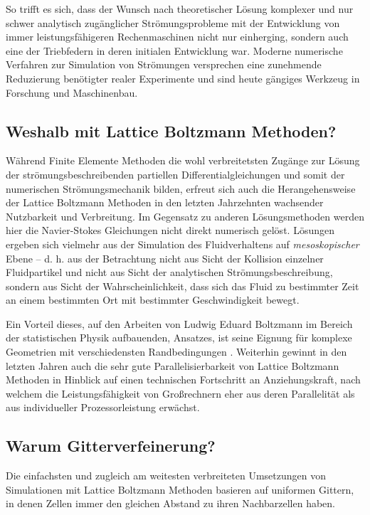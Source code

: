 So trifft es sich, dass der Wunsch nach theoretischer Lösung komplexer und nur schwer analytisch zugänglicher Strömungsprobleme mit der Entwicklung von immer leistungsfähigeren Rechenmaschinen nicht nur einherging, sondern auch eine der Triebfedern in deren initialen Entwicklung war. Moderne numerische Verfahren zur Simulation von Strömungen versprechen eine zunehmende Reduzierung benötigter realer Experimente und sind heute gängiges Werkzeug in Forschung und Maschinenbau.

\subsection{Weshalb mit Lattice Boltzmann Methoden?}

Während Finite Elemente Methoden die wohl verbreitetsten Zugänge zur Lösung der strömungsbeschreibenden partiellen Differentialgleichungen und somit der numerischen Strömungsmechanik bilden, erfreut sich auch die Herangehensweise der Lattice Boltzmann Methoden in den letzten Jahrzehnten wachsender Nutzbarkeit und Verbreitung. Im Gegensatz zu anderen Lösungsmethoden werden hier die Navier-Stokes Gleichungen nicht direkt numerisch gelöst. Lösungen ergeben sich vielmehr aus der Simulation des Fluidverhaltens auf \emph{mesoskopischer} Ebene -- d. h. aus der Betrachtung nicht aus Sicht der Kollision einzelner Fluidpartikel und nicht aus Sicht der analytischen Strömungsbeschreibung, sondern aus Sicht der Wahrscheinlichkeit, dass sich das Fluid zu bestimmter Zeit an einem bestimmten Ort mit bestimmter Geschwindigkeit bewegt.

\bigskip
Ein Vorteil dieses, auf den Arbeiten von Ludwig Eduard Boltzmann im Bereich der statistischen Physik aufbauenden, Ansatzes, ist seine Eignung für komplexe Geometrien mit verschiedensten Randbedingungen \cite{Aidun10}. Weiterhin gewinnt in den letzten Jahren auch die sehr gute Parallelisierbarkeit von Lattice Boltzmann Methoden in Hinblick auf einen technischen Fortschritt an Anziehungskraft, nach welchem die Leistungsfähigkeit von Großrechnern eher aus deren Parallelität als aus individueller Prozessorleistung erwächst.

\subsection{Warum Gitterverfeinerung?}

Die einfachsten und zugleich am weitesten verbreiteten Umsetzungen von Simulationen mit Lattice Boltzmann Methoden basieren auf uniformen Gittern, in denen Zellen immer den gleichen Abstand zu ihren Nachbarzellen haben.

